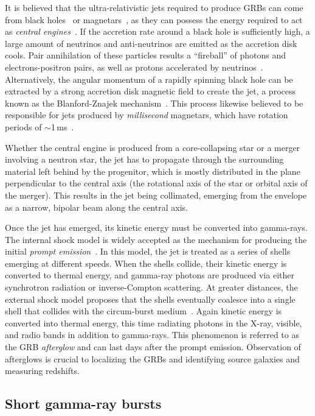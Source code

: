 It is believed that the ultra-relativistic jets required to produce \acp{GRB} can come from black holes~\citep{Woosley_1993} or magnetars~\citep{Dai_1998}, as they can possess the energy required to act as \textit{central engines}~\citep{Kumar_2015}.
If the accretion rate around a black hole is sufficiently high, a large amount of neutrinos and anti-neutrinos are emitted as the accretion disk cools.
Pair annihilation of these particles results a ``fireball'' of photons and electrons-positron pairs, as well as protons accelerated by neutrinos~\citep{Chen_2007}.
Alternatively, the angular momentum of a rapidly spinning black hole can be extracted by a strong accretion disk magnetic field to create the jet, a process known as the Blanford-Znajek mechanism~\citep{Blanford_1977,Lee_2000}.
This process likewise believed to be responsible for jets produced by \textit{millisecond} magnetars, which have rotation periods of $\sim$1\,ms~\citep{Metzger_2011}.

Whether the central engine is produced from a core-collapsing star or a merger involving a neutron star, the jet has to propagate through the surrounding material left behind by the progenitor, which is mostly distributed in the plane perpendicular to the central axis (the rotational axis of the star or orbital axis of the merger).
This results in the jet being collimated, emerging from the envelope as a narrow, bipolar beam along the central axis.

Once the jet has emerged, its kinetic energy must be converted into gamma-rays.
The internal shock model is widely accepted as the mechanism for producing the initial \textit{prompt emission}~\citep{Rees_1994}.
In this model, the jet is treated as a series of shells emerging at different speeds.
When the shells collide, their kinetic energy is converted to thermal energy, and gamma-ray photons are produced via either synchrotron radiation or inverse-Compton scattering.
At greater distances, the external shock model proposes that the shells eventually coalesce into a single shell that collides with the circum-burst medium~\citep{Blandford_1976}.
Again kinetic energy is converted into thermal energy, this time radiating photons in the X-ray, visible, and radio bands in addition to gamma-rays.
This phenomenon is referred to as the GRB \textit{afterglow} and can last days after the prompt emission.
Observation of afterglows is crucial to localizing the GRBs and identifying source galaxies and measuring redshifts.


\subsection{Short gamma-ray bursts}

